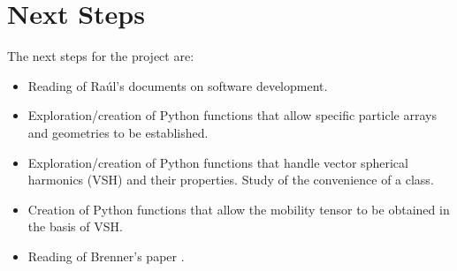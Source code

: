 \documentclass[12pt]{article}
\begin{document}
\section{Next Steps}
The next steps for the project are:
\begin{itemize}
    \item Reading of Raúl's documents on software development.
    \item Exploration/creation of Python functions that allow specific particle arrays and geometries to be established.
    \item Exploration/creation of Python functions that handle vector spherical harmonics (VSH) and their properties. Study of the convenience of a class.
    \item Creation of Python functions that allow the mobility tensor to be obtained in the basis of VSH.
    \item Reading of Brenner's paper \cite{BRENNER1961242}.
\end{itemize}

\printbibliography
\end{document}

